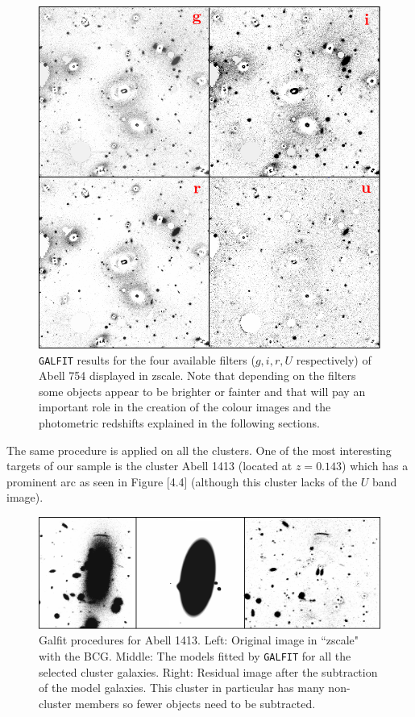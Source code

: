 \begin{figure}[H]
\centering
\includegraphics[width=12cm]{images/filters_A754.png}
\caption[All filters' results for Abell 754]{\texttt{GALFIT} results for the four available filters ($g,i,r,U$ respectively) of Abell 754 displayed in zscale. Note that depending on the filters some objects appear to be brighter or fainter and that will pay an important role in the creation of the colour images and the photometric redshifts explained in the following sections.}
\end{figure}

The same procedure is applied on all the clusters. One of the most interesting targets of our sample is the cluster Abell 1413 (located at $z=0.143$) which has a prominent arc as seen in Figure [4.4] (although this cluster lacks of the $U$ band image). 

\begin{figure}[H]
\centering
\includegraphics[width=15cm]{images/A1413.png}
\caption[Galfit results for Abell 1413]{Galfit procedures for  Abell 1413. Left: Original image in ``zscale" with the BCG. Middle: The models fitted by \texttt{GALFIT} for all the selected cluster galaxies. Right: Residual image after the subtraction of the model galaxies. This cluster in particular has many non-cluster members so fewer objects need to be subtracted.}
\end{figure}

